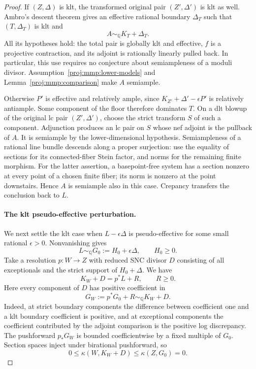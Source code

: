 \documentclass[11pt,letterpaper]{article}
\theoremstyle{definition}
\theoremstyle{remark}
\begin{document}
\begin{proof}
If \((Z,\Delta)\) is klt, the transformed original pair
\((Z',\Delta')\) is klt as well. Ambro's descent theorem
\cite[Theorem~0.2]{Proj-Ambro2005} gives an effective rational
boundary \(\Delta_T\) such that \((T,\Delta_T)\) is klt and
\[
 A\sim_{\mathbb{Q}}K_T+\Delta_T.
\]
All its hypotheses hold: the total pair is globally klt and
effective, \(f\) is a projective contraction, and its adjoint
is rationally linearly pulled back. In particular, this use
requires no conjecture about semiampleness of a moduli divisor.
Assumption~\ref{proj:mmp:lower-models} and
Lemma~\ref{proj:mmp:comparison} make \(A\) semiample.

Otherwise \(P'\) is effective and relatively ample, since
\(K_{Z'}+\Delta'-\epsilon P'\) is relatively antiample.
Some component of the floor therefore dominates \(T\).
On a dlt blowup of the original lc pair \((Z',\Delta')\),
choose the strict transform \(S\) of such a component.
Adjunction produces an lc pair on \(S\) whose nef adjoint
is the pullback of \(A\).
It is semiample by the lower-dimensional hypothesis.
Semiampleness of a rational line bundle descends along a proper
surjection: use the equality of sections for its connected-fiber
Stein factor, and norms for the remaining finite morphism.
For the latter assertion, a basepoint-free system has a section
nonzero at every point of a chosen finite fiber; its norm is
nonzero at the point downstairs. Hence \(A\) is semiample
also in this case. Crepancy transfers the conclusion back to \(L\).

\paragraph{The klt pseudo-effective perturbation.}
We next settle the klt case when \(L-\epsilon\Delta\) is
pseudo-effective for some small rational \(\epsilon>0\).
Nonvanishing gives
\[
 L\sim_{\mathbb{Q}}G_0:=H_0+\epsilon\Delta,\qquad H_0\geq 0.
\]
Take a resolution \(p\colon W\to Z\) with reduced SNC divisor
\(D\) consisting of all exceptionals and the strict support of
\(H_0+\Delta\). We have
\[
 K_W+D=p^*L+R,\qquad R\geq 0.
\]
Here every component of \(D\) has positive coefficient in
\[
 G_W:=p^*G_0+R\sim_{\mathbb{Q}}K_W+D.
\]
Indeed, at strict boundary components the difference between
coefficient one and a klt boundary coefficient is positive,
and at exceptional components the coefficient contributed by
the adjoint comparison is the positive log discrepancy.
The pushforward \(p_*G_W\) is bounded coefficientwise by a
fixed multiple of \(G_0\). Section spaces inject under
birational pushforward, so
\[
 0\leq\kappa(W,K_W+D)\leq\kappa(Z,G_0)=0.
\]


\end{proof}
\end{document}

